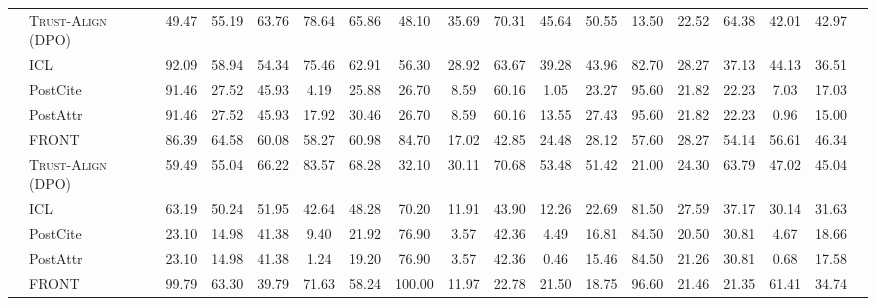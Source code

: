 \documentclass{article} %
\newcommand{\cdashlinelr}[1]{%
  \noalign{\vskip 2mm}  %
  \cdashline{#1}        %
  \noalign{\vskip 2mm}  %
}
\newcommand{\hlinelr}[1]{%
  \noalign{\vskip 2mm}  %
  \hline    
  \noalign{\vskip 2mm}  %
}
\newcommand{\method}[0]{\textsc{Trust-Align}}
\begin{document}
\begin{table}[htb!]
{\begin{tabular}{ll*{16}{c}}
\cdashlinelr{2-17}
& \method{} (DPO) & 49.47 & \cellcolor{lightyellow}55.19 & \cellcolor{lightyellow}63.76 & \cellcolor{lightyellow}78.64 & \cellcolor{lightyellow}65.86 & 48.10 & \cellcolor{lightyellow}35.69 & \cellcolor{lightyellow}70.31 & \cellcolor{lightyellow}45.64 & \cellcolor{lightyellow}50.55 & 13.50 & 22.52 & \cellcolor{lightyellow}64.38 & \cellcolor{lightyellow}42.01 & \cellcolor{lightyellow}42.97 \\

\hlinelr{1-17}
\multirow{6}{*}{\mystack{Qwen-2.5}{-7b}}  & ICL & 92.09 & 58.94 & 54.34 & 75.46 & 62.91 & 56.30 &  28.92 & 63.67 & 39.28 &  43.96 & 82.70 & 28.27 & 37.13 & 44.13 & 36.51 \\
& PostCite & 91.46 & 27.52 & 45.93 & 4.19 & 25.88 & 26.70 & 8.59 & 60.16 & 1.05 & 23.27 & 95.60 & 21.82 & 22.23 & 7.03 & 17.03 \\
& PostAttr & 91.46 & 27.52 & 45.93 & 17.92 & 30.46 & 26.70 & 8.59 & 60.16 & 13.55 & 27.43 & 95.60 & 21.82 & 22.23 & 0.96 & 15.00 \\
& FRONT & 86.39 & \cellcolor{lightyellow}64.58 & 60.08 & 58.27 & 60.98 & 84.70 & 17.02 & 42.85 & 24.48 & 28.12 & 57.60 & \cellcolor{lightyellow}28.27 & 54.14 & \cellcolor{lightyellow}56.61 & \cellcolor{lightyellow}46.34 \\

\cdashlinelr{2-17}
& \method{} (DPO) & 59.49 & 55.04 & \cellcolor{lightyellow}66.22 & \cellcolor{lightyellow}83.57 & \cellcolor{lightyellow}68.28 & 32.10 & \cellcolor{lightyellow}30.11 & \cellcolor{lightyellow}70.68 & \cellcolor{lightyellow}53.48 & \cellcolor{lightyellow}51.42 & 21.00 & 24.30 & \cellcolor{lightyellow}63.79 & 47.02 & 45.04 \\

\hlinelr{1-17}
\multirow{6}{*}{\mystack{Phi3.5}{-mini}}  & ICL & 63.19 & 50.24 & 51.95 & 42.64 & 48.28 & 70.20 & 11.91 & 43.90 & 12.26 & 22.69 & 81.50 & 27.59 & 37.17 & 30.14 & 31.63 \\
& PostCite & 23.10 & 14.98 & 41.38 & 9.40 & 21.92 & 76.90 & 3.57 & 42.36 & 4.49 & 16.81 & 84.50 & 20.50 & 30.81 & 4.67 & 18.66 \\
& PostAttr & 23.10 & 14.98 & 41.38 & 1.24 & 19.20 & 76.90 & 3.57 & 42.36 & 0.46 & 15.46 & 84.50 & 21.26 & 30.81 & 0.68 & 17.58 \\
& FRONT & 99.79 &\cellcolor{lightyellow} 63.30 & 39.79 & 71.63 & 58.24 & 100.00 & 11.97 & 22.78 & 21.50 & 18.75 & 96.60 & 21.46 & 21.35 & 61.41 & 34.74 \\


\end{tabular}}
\end{table}
\end{document}
